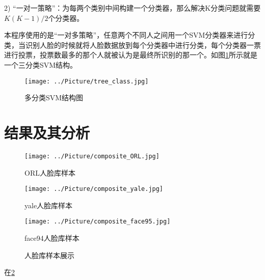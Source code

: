 \documentclass[a4paper,12pt]{ctexart}
\begin{document}
 2) “一对一策略”：为每两个类别中间构建一个分类器，那么解决K分类问题就需要$K(K-1)/2$个分类器。

 
 本程序使用的是“一对多策略”，任意两个不同人之间用一个SVM分类器来进行分类，当识别人脸的时候就将人脸数据放到每个分类器中进行分类，每个分类器一票进行投票，投票数最多的那个人就被认为是最终所识别的那一个。如图\ref{fig:msvm}所示就是一个三分类SVM结构。
 

\begin{figure}[!htb]
  \centering
  \texttt{[image: ../Picture/tree\_class.jpg]}
  \caption{多分类SVM结构图}
  \label{fig:msvm}
\end{figure}

\newpage
\section{结果及其分析}

\begin{figure}[ht]
\begin{minipage}{0.3\linewidth}
\centerline{\texttt{[image: ../Picture/composite\_ORL.jpg]}}
\centerline{ORL人脸库样本}
\end{minipage}
\quad
\begin{minipage}{0.3\linewidth}
\centerline{\texttt{[image: ../Picture/composite\_yale.jpg]}}
\centerline{yale人脸库样本}
\end{minipage}
\quad
\begin{minipage}{0.3\linewidth}
\centerline{\texttt{[image: ../Picture/composite\_face95.jpg]}}
\centerline{face94人脸库样本}
\end{minipage}
\caption{人脸库样本展示}
\label{pic:difpic}
\end{figure}
在\ref{pic:difpic}
\end{document}
